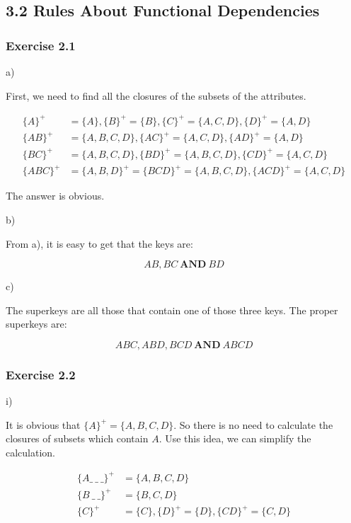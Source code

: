 \documentclass[../../main.tex]{subfiles}
\begin{document}
\subsection{3.2 Rules About Functional Dependencies}

\subsubsection*{Exercise 2.1}

a)

First, we need to find all the closures of the subsets
of the attributes.

\begin{align*}
  \{A\}^{+} &= \{A\},   \{B\}^{+} = \{B\},
  \{C\}^{+} = \{A, C, D\}, \{D\}^{+}= \{A,D\} \\
  \{AB\}^{+} &= \{A,B,C,D\},  \{AC\}^{+} = \{A,C,D\},
  \{AD\}^{+} = \{A,D\} \\
  \{BC\}^{+} &= \{A,B,C,D\}, \{BD\}^{+} = \{A,B,C,D\},
  \{CD\}^{+} = \{A,C,D\} \\
  \{ABC\}^{+} &= \{A,B,D\}^{+} = \{BCD\}^{+} = \{A,B,C,D\},
  \{ACD\}^{+} = \{A,C,D\}
\end{align*}

The answer is obvious.

b)

From a), it is easy to get that the keys are:

$$
AB, BC \ \mathbf{AND} \ BD
$$

c)

The superkeys are all those that contain one of those three
keys. The proper superkeys are:

$$
ABC, ABD, BCD \ \mathbf{AND} \ ABCD
$$

\subsubsection*{Exercise 2.2}

i)

It is obvious that $\{A\}^{+} = \{A,B,C,D\}$. So there is no
need to calculate the closures of subsets which contain $A$.
Use this idea, we can simplify the calculation.

\begin{align*}
  \{A \_ \ \_ \ \_ \}^{+} &= \{A,B,C,D\} \\
  \{B \ \_ \ \_ \}^{+} &= \{B,C,D\} \\
  \{C\}^{+} &= \{C\}, \{D\}^{+} = \{D\}, \{CD\}^{+} = \{C,D\}
\end{align*}
\end{document}
